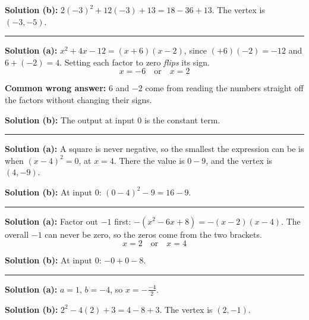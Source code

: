 \documentclass[12pt]{article}
\begin{document}
\textbf{Solution (b):} $2(-3)^2 + 12(-3) + 13 = 18 - 36 + 13$. The vertex is $(-3, -5)$. 

\vspace{0.2cm}\noindent\rule{\linewidth}{0.2pt}


\textbf{Solution (a):} $x^2 + 4x - 12 = (x + 6)(x - 2)$, since $(+6)(-2) = -12$ and $6 + (-2) = 4$. Setting each factor to zero \emph{flips} its sign.
\[ \boxed{x = -6 \quad \text{or} \quad x = 2} \]

\textbf{Common wrong answer:} $6$ and $-2$ come from reading the numbers straight off the factors without changing their signs.

\textbf{Solution (b):} The output at input $0$ is the constant term. 

\vspace{0.2cm}\noindent\rule{\linewidth}{0.2pt}


\textbf{Solution (a):} A square is never negative, so the smallest the expression can be is when $(x-4)^2 = 0$, at $x = 4$. There the value is $0 - 9$, and the vertex is $(4, -9)$. 

\textbf{Solution (b):} At input $0$: $(0 - 4)^2 - 9 = 16 - 9$. 

\vspace{0.2cm}\noindent\rule{\linewidth}{0.2pt}


\textbf{Solution (a):} Factor out $-1$ first: $-(x^2 - 6x + 8) = -(x - 2)(x - 4)$. The overall $-1$ can never be zero, so the zeros come from the two brackets.
\[ \boxed{x = 2 \quad \text{or} \quad x = 4} \]

\textbf{Solution (b):} At input $0$: $-0 + 0 - 8$. 

\vspace{0.2cm}\noindent\rule{\linewidth}{0.2pt}


\textbf{Solution (a):} $a = 1$, $b = -4$, so $x = -\frac{-4}{2}$. 

\textbf{Solution (b):} $2^2 - 4(2) + 3 = 4 - 8 + 3$. The vertex is $(2, -1)$. 
\end{document}
